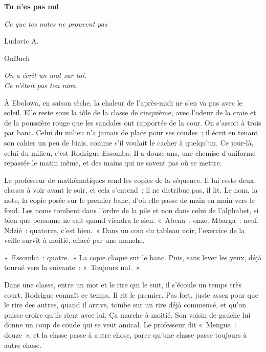 \documentclass[10.5pt,twoside,openright]{book}
\newcommand{\chapitresn}[1]{\cleardoublepage\markright{#1}\thispagestyle{plain}\vspace*{2.8cm}{\noindent\LARGE\bfseries #1\par}\vspace{1.6em}\noindent\ignorespaces}
\begin{document}
\frontmatter

\begin{titlepage}\centering\vspace*{3cm}
{\Huge\bfseries Tu n’es pas nul\par}\vspace{0.6cm}
{\large\itshape Ce que tes notes ne prouvent pas\par}\vspace{2.2cm}
{\Large Ludovic A.\par}\vfill{\small OnBuch\par}\end{titlepage}
\thispagestyle{empty}\cleardoublepage
\thispagestyle{empty}\vspace*{\fill}\begin{center}\itshape On a écrit un mot sur toi.\\Ce n’était pas ton nom.\end{center}\vspace*{\fill}\cleardoublepage

\mainmatter
\chapitresn{Prologue — Le mot}

À Ebolowa, en saison sèche, la chaleur de l’après-midi ne s’en va pas avec le soleil. Elle reste sous la tôle de la classe de cinquième, avec l’odeur de la craie et de la poussière rouge que les sandales ont rapportée de la cour. On s’assoit à trois par banc. Celui du milieu n’a jamais de place pour ses coudes ; il écrit en tenant son cahier un peu de biais, comme s’il voulait le cacher à quelqu’un. Ce jour-là, celui du milieu, c’est Rodrigue Essomba. Il a douze ans, une chemise d’uniforme repassée le matin même, et des mains qui ne savent pas où se mettre.

Le professeur de mathématiques rend les copies de la séquence. Il lui reste deux classes à voir avant le soir, et cela s’entend : il ne distribue pas, il lit. Le nom, la note, la copie posée sur le premier banc, d’où elle passe de main en main vers le fond. Les noms tombent dans l’ordre de la pile et non dans celui de l’alphabet, si bien que personne ne sait quand viendra le sien. « Abena : onze. Mbarga : neuf. Ndzié : quatorze, c’est bien. » Dans un coin du tableau noir, l’exercice de la veille survit à moitié, effacé par une manche.

« Essomba : quatre. » La copie claque sur le banc. Puis, sans lever les yeux, déjà tourné vers la suivante : « Toujours nul. »

Dans une classe, entre un mot et le rire qui le suit, il s’écoule un temps très court. Rodrigue connaît ce temps. Il rit le premier. Pas fort, juste assez pour que le rire des autres, quand il arrive, tombe sur un rire déjà commencé, et qu’on puisse croire qu’ils rient avec lui. Ça marche à moitié. Son voisin de gauche lui donne un coup de coude qui se veut amical. Le professeur dit « Mengue : douze », et la classe passe à autre chose, parce qu’une classe passe toujours à autre chose.
\end{document}

